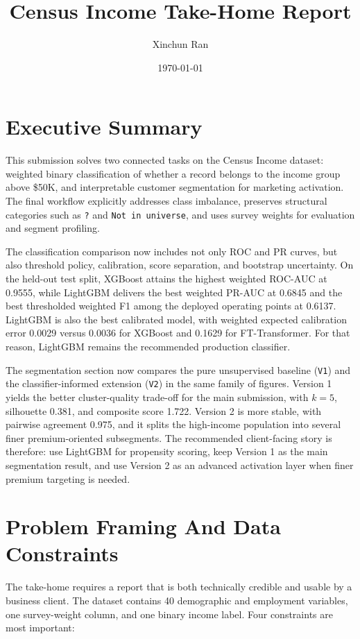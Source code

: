 \documentclass[12pt]{article}
\title{Census Income Take-Home Report}
\author{Xinchun Ran}
\date{\today}
\begin{document}
\maketitle

\section{Executive Summary}

This submission solves two connected tasks on the Census Income dataset:
weighted binary classification of whether a record belongs to the income group
above \$50K, and interpretable customer segmentation for marketing activation.
The final workflow explicitly addresses class imbalance, preserves structural
categories such as \texttt{?} and \texttt{Not in universe}, and uses survey
weights for evaluation and segment profiling.

The classification comparison now includes not only ROC and PR curves, but also
threshold policy, calibration, score separation, and bootstrap uncertainty. On
the held-out test split, XGBoost attains the highest weighted ROC-AUC at 0.9555,
while LightGBM delivers the best weighted PR-AUC at 0.6845 and the best
thresholded weighted F1 among the deployed operating points at 0.6137. LightGBM
is also the best calibrated model, with weighted expected calibration error
0.0029 versus 0.0036 for XGBoost and 0.1629 for FT-Transformer. For that reason,
LightGBM remains the recommended production classifier.

The segmentation section now compares the pure unsupervised baseline
(\texttt{V1}) and the classifier-informed extension (\texttt{V2}) in the same
family of figures.
Version 1 yields the better cluster-quality trade-off for the main submission,
with $k=5$, silhouette 0.381, and composite score 1.722. Version 2 is more
stable, with pairwise agreement 0.975, and it splits the high-income population
into several finer premium-oriented subsegments. The recommended client-facing
story is therefore: use LightGBM for propensity scoring, keep Version 1 as the
main segmentation result, and use Version 2 as an advanced activation layer when
finer premium targeting is needed.

\section{Problem Framing And Data Constraints}

The take-home requires a report that is both technically credible and usable by
a business client. The dataset contains 40 demographic and employment variables,
one survey-weight column, and one binary income label. Four constraints are most
important:
\end{document}
